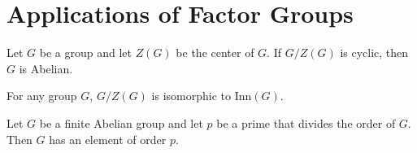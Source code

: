 \section{Applications of Factor Groups}

\begin{theorem}
	Let $G$ be a group and let $Z(G)$ be the center of $G$. If $G/Z(G)$ is cyclic, then $G$ is Abelian.
\end{theorem}

\begin{theorem}
	For any group $G$, $G/Z(G)$ is isomorphic to Inn$(G)$.
\end{theorem}

\begin{theorem}
	Let $G$ be a finite Abelian group and let $p$ be a prime that divides the order of $G$. Then $G$ has an element of order $p$.
\end{theorem}
